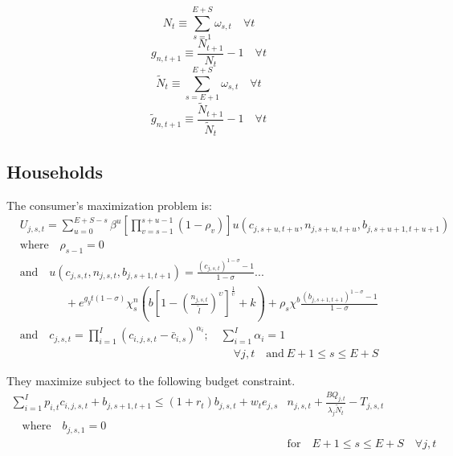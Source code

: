 \documentclass[letterpaper,12pt]{article}
\theoremstyle{definition}
\begin{document}
\begin{spacing}{1.5}
    \begin{equation}\label{EqPopDef}
      N_t\equiv\sum_{s=1}^{E+S} \omega_{s,t} \quad\forall t
    \end{equation}
    \begin{equation}\label{EqPopGrowth}
      g_{n,t+1} \equiv \frac{N_{t+1}}{N_t} - 1 \quad\forall t
    \end{equation}
    \begin{equation}\label{EqPopWkDef}
      \tilde{N}_t\equiv\sum_{s=E+1}^{E+S} \omega_{s,t} \quad\forall t
    \end{equation}
    \begin{equation}\label{EqPopWkGrowth}
      \tilde{g}_{n,t+1} \equiv \frac{\tilde{N}_{t+1}}{\tilde{N}_t} - 1 \quad\forall t
    \end{equation}


  \subsection{Households}
    The consumer's maximization problem is:
    \begin{equation}\label{EqUtilMax}
      \begin{split}
        &U_{j,s,t} = \sum_{u=0}^{E+S-s}\beta^u\left[\prod_{v=s-1}^{s+u-1}(1-\rho_v)\right] u\left(c_{j,s+u,t+u},n_{j,s+u,t+u},b_{j,s+u+1,t+u+1}\right) \\
        &\text{where}\quad \rho_{s-1}=0 \\
        &\text{and} \quad u\left(c_{j,s,t},n_{j,s,t},b_{j,s+1,t+1}\right) = \frac{\left(c_{j,s,t}\right)^{1-\sigma} - 1}{1-\sigma} ... \\
        &\qquad\qquad + e^{g_y t(1-\sigma)}\chi^n_s\left(b\left[1 - \left(\frac{n_{j,s,t}}{\tilde{l}}\right)^\upsilon\right]^\frac{1}{\upsilon} + k\right) + \rho_s\chi^b\frac{\left(b_{j,s+1,t+1}\right)^{1-\sigma} - 1}{1-\sigma} \\
        &\text{and} \quad c_{j,s,t} = \prod_{i=1}^I \left( c_{i,j,s,t} - \bar c_{i,s} \right) ^{\alpha_i}; \quad \sum_{i=1}^I \alpha_i = 1 \\
        &\quad\quad\quad\quad\quad\quad\quad\quad\quad\quad\quad\quad\quad\quad\quad\quad\quad\quad\quad\forall j,t\quad\text{and}\:E+1\leq s\leq E+S
      \end{split}
    \end{equation}

    They maximize subject to the following budget constraint.
    \begin{equation}\label{EqBC}
      \begin{split}
        \sum_{i=1}^I p_{i,t}c_{i,j,s,t} + b_{j,s+1,t+1} \leq \left(1 + r_t\right) b_{j,s,t} + w_t e_{j,s}&n_{j,s,t} + \frac{BQ_{j,t}}{\lambda_j\tilde{N}_t} - T_{j,s,t} \\
        \quad\text{where}\quad b_{j,s,1} = 0 \\
        &\text{for} \quad E+1\leq s \leq E+S \quad \forall j,t
      \end{split}
    \end{equation}


\end{spacing}
\end{document}
